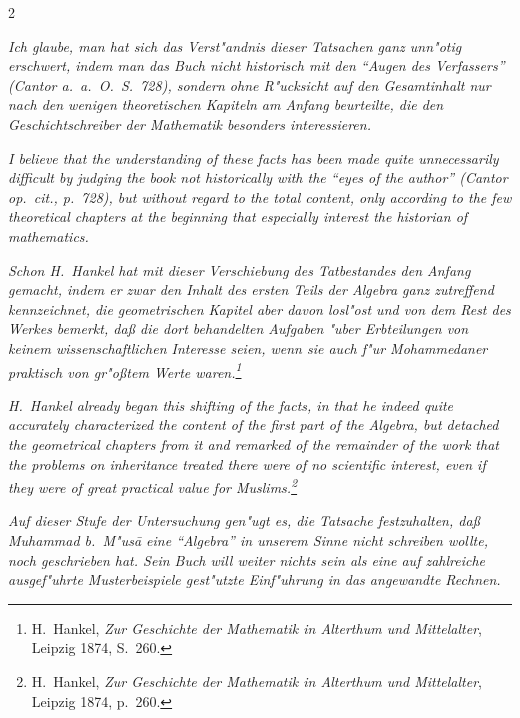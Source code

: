 \documentclass[10pt,a4paper]{article}
\newcommand{\enquote}[1]{``#1''}
\begin{document}
\begin{paracol}{2}
\switchcolumn*

\textit{Ich glaube, man hat sich das Verst"andnis dieser Tatsachen ganz unn"otig erschwert, indem man das Buch nicht historisch mit den \enquote{Augen des Verfassers} (Cantor a.\ a.\ O.\ S.\ 728), sondern ohne R"ucksicht auf den Gesamtinhalt nur nach den wenigen theoretischen Kapiteln am Anfang beurteilte, die den Geschichtschreiber der Mathematik besonders interessieren.}

\switchcolumn

\textit{I believe that the understanding of these facts has been made quite unnecessarily difficult by judging the book not historically with the \enquote{eyes of the author} (Cantor \textit{op.\ cit.}, p.\ 728), but without regard to the total content, only according to the few theoretical chapters at the beginning that especially interest the historian of mathematics.}

\switchcolumn*

\textit{Schon H.\ Hankel hat mit dieser Verschiebung des Tatbestandes den Anfang gemacht, indem er zwar den Inhalt des ersten Teils der Algebra ganz zutreffend kennzeichnet, die geometrischen Kapitel aber davon losl"ost und von dem Rest des Werkes bemerkt, da\ss{} die dort behandelten Aufgaben "uber Erbteilungen von keinem wissenschaftlichen Interesse seien, wenn sie auch f"ur Mohammedaner praktisch von gr"o\ss{}tem Werte waren.\footnote{H.\ Hankel, \textit{Zur Geschichte der Mathematik in Alterthum und Mittelalter}, Leipzig 1874, S.\ 260.}}

\switchcolumn

\textit{H.\ Hankel already began this shifting of the facts, in that he indeed quite accurately characterized the content of the first part of the Algebra, but detached the geometrical chapters from it and remarked of the remainder of the work that the problems on inheritance treated there were of no scientific interest, even if they were of great practical value for Muslims.\footnote{H.\ Hankel, \textit{Zur Geschichte der Mathematik in Alterthum und Mittelalter}, Leipzig 1874, p.\ 260.}}

\switchcolumn*

\textit{Auf dieser Stufe der Untersuchung gen"ugt es, die Tatsache festzuhalten, da\ss{} Muhammad b.\ M"us\=a eine \enquote{Algebra} in unserem Sinne nicht schreiben wollte, noch geschrieben hat. Sein Buch will weiter nichts sein als eine auf zahlreiche ausgef"uhrte Musterbeispiele gest"utzte Einf"uhrung in das angewandte Rechnen.}


\end{paracol}
\end{document}
